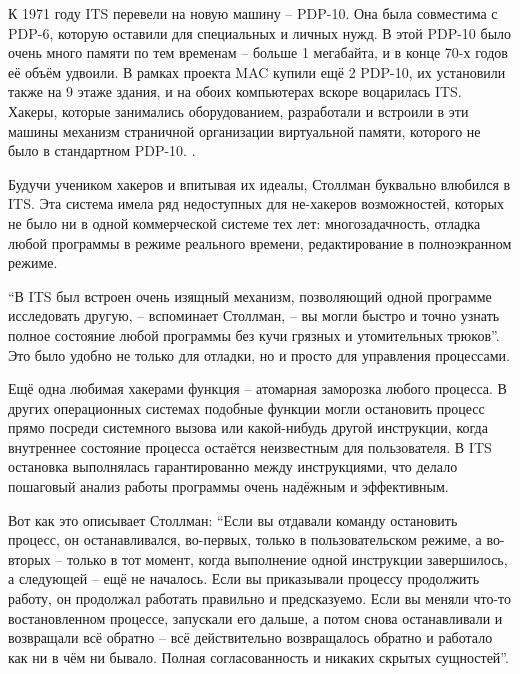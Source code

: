 К 1971 году ITS перевели на новую машину -- PDP-10. Она была совместима с PDP-6, которую оставили для специальных и личных нужд. В этой PDP-10 было очень много памяти по тем временам -- больше 1 мегабайта, и в конце 70-х годов её объём удвоили. В рамках проекта MAC купили ещё 2 PDP-10, их установили также на 9 этаже здания, и на обоих компьютерах вскоре воцарилась ITS. Хакеры, которые занимались оборудованием, разработали и встроили в эти машины механизм страничной организации виртуальной памяти, которого не было в стандартном PDP-10. .

Будучи учеником хакеров и впитывая их идеалы, Столлман буквально влюбился в ITS. Эта система имела ряд недоступных для не-хакеров возможностей, которых не было ни в одной коммерческой системе тех лет: многозадачность, отладка любой программы в режиме реального времени, редактирование в полноэкранном режиме.

\enquote{В ITS был встроен очень изящный механизм, позволяющий одной программе исследовать другую, -- вспоминает Столлман, -- вы могли быстро и точно узнать полное состояние любой программы без кучи грязных и утомительных трюков}. Это было удобно не только для отладки, но и просто для управления процессами.

Ещё одна любимая хакерами функция -- атомарная заморозка любого процесса. В других операционных системах подобные функции могли остановить процесс прямо посреди системного вызова или какой-нибудь другой инструкции, когда внутреннее состояние процесса остаётся неизвестным для пользователя. В ITS остановка выполнялась гарантированно между инструкциями, что делало пошаговый анализ работы программы очень надёжным и эффективным.

Вот как это описывает Столлман: \enquote{Если вы отдавали команду остановить процесс, он останавливался, во-первых, только в пользовательском режиме, а во-вторых -- только в тот момент, когда выполнение одной инструкции завершилось, а следующей -- ещё не началось. Если вы приказывали процессу продолжить работу, он продолжал работать правильно и предсказуемо. Если вы меняли что-то востановленном процессе, запускали его дальше, а потом снова останавливали и возвращали всё обратно -- всё действительно возвращалось обратно и работало как ни в чём ни бывало. Полная согласованность и никаких скрытых сущностей}.

